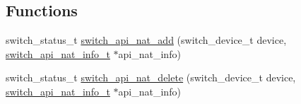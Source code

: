 \subsection*{Functions}
\begin{DoxyCompactItemize}
\item 
switch\+\_\+status\+\_\+t \hyperlink{group__NAT_ga0f32a843a0103c11628630dbc871eb5e}{switch\+\_\+api\+\_\+nat\+\_\+add} (switch\+\_\+device\+\_\+t device, \hyperlink{group__NAT_ga733f3ff07128e89619717abae4059dc1}{switch\+\_\+api\+\_\+nat\+\_\+info\+\_\+t} $\ast$api\+\_\+nat\+\_\+info)
\item 
switch\+\_\+status\+\_\+t \hyperlink{group__NAT_gabf481721abc2eebc1f341a408250d528}{switch\+\_\+api\+\_\+nat\+\_\+delete} (switch\+\_\+device\+\_\+t device, \hyperlink{group__NAT_ga733f3ff07128e89619717abae4059dc1}{switch\+\_\+api\+\_\+nat\+\_\+info\+\_\+t} $\ast$api\+\_\+nat\+\_\+info)
\end{DoxyCompactItemize}


